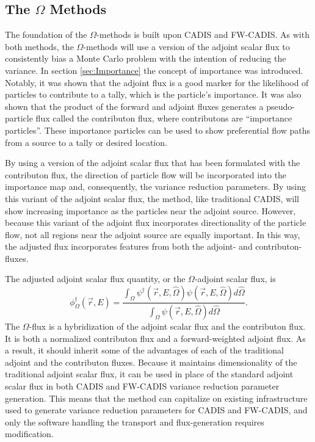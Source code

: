 \subsection{The $\Omega$ Methods}
\label{sec:omegaintro}

The foundation of the $\Omega$-methods is built upon CADIS and FW-CADIS. As with
both methods,
the $\Omega$-methods will use a version of the adjoint scalar flux to
consistently bias a Monte Carlo problem with the intention of reducing the
variance. In section \ref{sec:Importance} the concept of importance was
introduced. Notably, it was shown that the adjoint flux is a good marker
for the likelihood of particles to contribute to a tally, which is the
particle's importance. It was also shown that the
product of the forward and adjoint fluxes generates a pseudo-particle flux called
the contributon flux, where contributons are ``importance particles''.
These importance particles can be used to show preferential flow paths from a
source to a tally or desired location.

By using a version of the adjoint scalar flux that has been formulated with the
contributon flux, the direction of particle flow will be incorporated into the
importance map and, consequently, the
variance reduction parameters. By using this variant of the adjoint scalar flux,
the method, like traditional CADIS, will show increasing importance as the
particles near the adjoint source. However, because this variant of the adjoint
flux incorporates directionality of the particle flow, not all regions near the
adjoint source are equally important. In this way, the adjusted flux
incorporates features from both the adjoint- and contributon- fluxes.

The adjusted adjoint scalar flux quantity, or the $\Omega$-adjoint
scalar flux, is
%
\begin{equation}
  \phi^{\dagger}_{\Omega}(\vec {r} ,E)  = \frac{\int_{\Omega}{\psi^{\dagger}
                             (\vec{r}, E, \hat\Omega)
                             \psi(\vec{r}, E, \hat\Omega)} d\hat{\Omega}}
                             {\int_{\Omega}\psi(\vec{r}, E, \hat\Omega)
                             d\hat{\Omega}}.
\label{eq:omega_basic}
\end{equation}
%
The $\Omega$-flux is a hybridization of the adjoint scalar flux and the contributon
flux. It is both a normalized contributon flux and a forward-weighted
adjoint flux. As a result, it should inherit some of the advantages of
each of the traditional
adjoint and the contributon fluxes. Because it maintains dimensionality of the
traditional adjoint scalar flux, it can be used in place of the standard adjoint
scalar flux in both
CADIS and FW-CADIS variance reduction parameter generation.
This means that the method can capitalize on existing infrastructure used to
generate variance reduction parameters for CADIS and FW-CADIS, and only the
software handling the transport and flux-generation requires modification.

